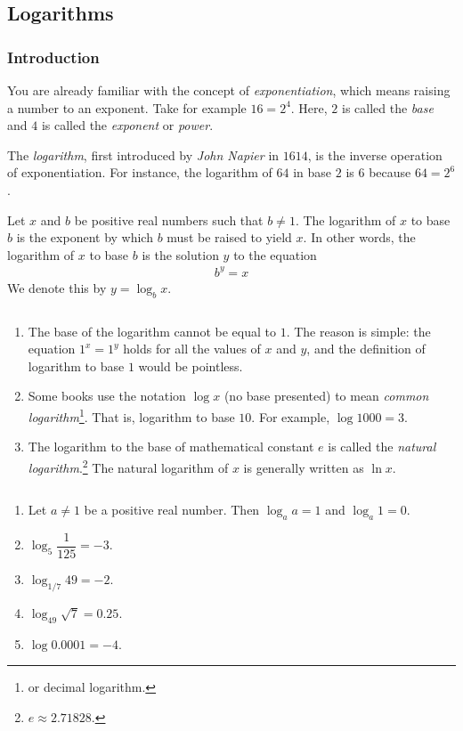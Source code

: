 \subsection{Logarithms}\label{sec:logarithm}
\subsubsection{Introduction}
You are already familiar with the concept of \textit{exponentiation}, which means raising a number to an exponent. Take for example $16=2^4$. Here, $2$ is called the \textit{base} and $4$ is called the \textit{exponent} or \textit{power}.

The \textit{logarithm}, first introduced by \textit{John Napier} in $1614$, is the inverse operation of exponentiation. For instance, the logarithm of $64$ in base $2$ is $6$ because $64=2^6$.

\begin{definition}
	Let $x$ and $b$ be positive real numbers such that $b \neq 1$. The logarithm of $x$ to base $b$ is the exponent by which $b$ must be raised to yield $x$.  In other words, the logarithm of $x$ to base $b$ is the solution $y$ to the equation
	\begin{align*}
		b^y = x
	\end{align*}
	We denote this by $y = \log_b x$.
\end{definition}

\begin{remark}
	$ $
	\begin{enumerate}
		\item The base of the logarithm cannot be equal to $1$. The reason is simple: the equation $1^x = 1^y$ holds for all the values of $x$ and $y$, and the definition of logarithm to base $1$ would be pointless\watermark.

		\item Some books use the notation $\log x$ (no base presented) to mean \textit{common logarithm}\footnote{or decimal logarithm.}. That is, logarithm to base $10$. For example, $\log 1000=3$.

		\item The logarithm to the base of mathematical constant $e$ is called the \textit{natural logarithm}.\footnote{$e\approx 2.71828.$} The natural logarithm of $x$ is generally written as $\ln x$.
	\end{enumerate}
\end{remark}

\begin{example}
	$ $
	\begin{enumerate}
		\item Let $a \neq 1$ be a positive real number. Then $\log_a a=1$ and $\log_a 1 = 0$.
		\item $\log_5 \dfrac{1}{125}=-3$.
		\item $\log_{1/7} 49 = -2$.
		\item $\log_{49} \sqrt 7 = 0.25$.
		\item $\log 0.0001 = -4$.
	\end{enumerate}
\end{example}
